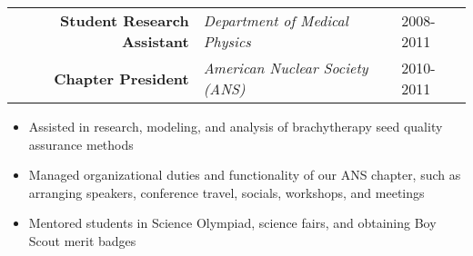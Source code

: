 \begin{minipage}{\textwidth}
	\begin{center}
		\begin{tabular}{rll}
			\textbf{Student Research Assistant} & \textit{Department of Medical Physics} & 2008-2011 \\
			\textbf{Chapter President} & \textit{American Nuclear Society (ANS)} & 2010-2011 \\
		\end{tabular}
	\end{center}
\end{minipage}

\begin{minipage}{\textwidth}
	\begin{itemize}
		\item Assisted in research, modeling, and analysis of brachytherapy seed quality assurance methods
		\item Managed organizational duties and functionality of our ANS chapter, such as arranging speakers, conference travel, socials, workshops, and meetings
		\item Mentored students in Science Olympiad, science fairs, and obtaining Boy Scout merit badges
	\end{itemize}
\end{minipage}
